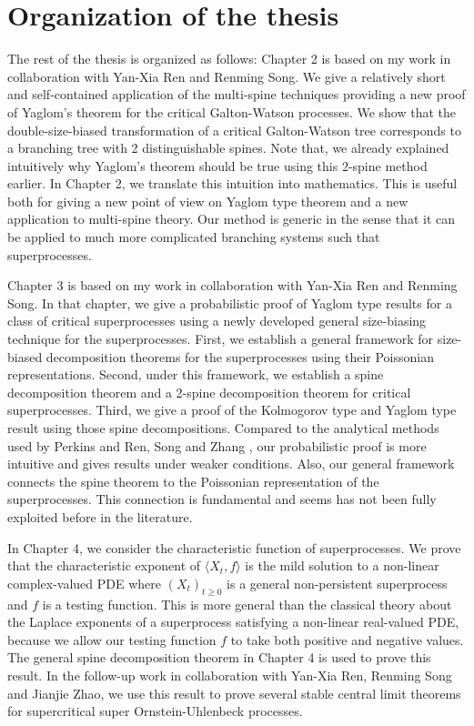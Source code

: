 \documentclass[UTF8]{pkuthss}
\theoremstyle{plain}
\theoremstyle{definition}
\numberwithin{equation}{section}
\begin{document}
\section{Organization of the thesis}
	The rest of the thesis is organized as follows:
	Chapter 2 is based on my work \cite{RenSongSun20182spine} in collaboration with Yan-Xia Ren and Renming Song.
    We give a relatively short and self-contained application of the multi-spine techniques providing a new proof of Yaglom's theorem for the critical Galton-Watson processes. 
    We show that the double-size-biased transformation of a critical Galton-Watson tree corresponds to a branching tree with 2 distinguishable spines. 
    Note that, we already explained intuitively why Yaglom's theorem should be true using this 2-spine method earlier. 
    In Chapter 2, we translate this intuition into mathematics. 
    This is useful both for giving a new point of view on Yaglom type theorem and a new application to multi-spine theory. 
    Our method is generic in the sense that it can be applied to much more complicated branching systems such that superprocesses. 

    Chapter 3 is based on my work \cite{RenSongSun2019Spine} in collaboration with Yan-Xia Ren and Renming Song. In that chapter, we give a probabilistic proof of Yaglom type results for a class of critical superprocesses using a newly developed general size-biasing technique for the superprocesses. First, we establish a general framework for size-biased decomposition theorems for the superprocesses using their Poissonian representations. Second, under this framework, we establish a spine decomposition theorem and a 2-spine decomposition theorem for critical superprocesses. Third, we give a proof of the Kolmogorov type and Yaglom type result using those spine decompositions.  Compared to the analytical methods used by Perkins \cite{EvansPerkins1990Measurevalued} and Ren, Song and Zhang \cite{RenSongZhang2015Limit}, our probabilistic proof is more intuitive and gives results under weaker conditions. Also, our general framework connects the spine theorem to the Poissonian representation of the superprocesses. This connection is fundamental and seems has not been fully exploited before in the literature. 

    In Chapter 4, we consider the characteristic function of superprocesses. 
    We prove that the characteristic exponent of $\langle X_t,f\rangle$ is the mild solution to a non-linear complex-valued PDE where $(X_t)_{t\geq 0}$ is a general non-persistent superprocess and $f$ is a testing function. 
    This is more general than the classical theory about the Laplace exponents of a superprocess satisfying a non-linear real-valued PDE, because we allow our testing function $f$ to take both positive and negative values. 
    The general spine decomposition theorem in Chapter 4 is used to prove this result. In the follow-up work \cite{RenSongSunZhao2019Stable} in collaboration with Yan-Xia Ren, Renming Song and Jianjie Zhao, we use this result to prove several stable central limit theorems for supercritical super Ornstein-Uhlenbeck processes.
    
\end{document}
